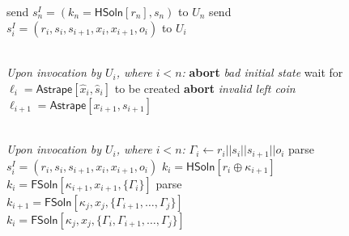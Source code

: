 \documentclass[USenglish,oneside,twocolumn]{article}
\begin{document}
\begin{figure}
\begin{framed}
\begin{minipage}{0.45\textwidth}
\begin{algorithmic}
                \State send $s^I_n=(k_n=\mathsf{HSoln}[r_n], s_n)$ to $U_n$
                \Else
                \State send $s^I_i=(r_i, s_i, s_{i+1}, x_i, x_{i+1}, o_i)$ to $U_i$
                \EndIf
                \EndFor
                \EndFunction
            \end{algorithmic}
            \medskip
            \begin{algorithmic}
                \\
                \emph{Upon invocation by $U_i$, where $i<n$:}
                \State \textbf{abort} \emph{bad initial state}
                \EndIf
                \State wait for $\ell_{i}=\mathsf{Astrape}[\hat{x}_i, \hat{s}_i]$ to be created
                \State \textbf{abort} \emph{invalid left coin}
                \EndIf
                \EndIf
                \Return $\ell_{i+1} = \mathsf{Astrape}[x_{i+1}, s_{i+1}]$
                \EndFunction
            \end{algorithmic}
        \end{minipage}
        \hfill
        \begin{minipage}{0.45\textwidth}
            \begin{algorithmic}
                \\
                \emph{Upon invocation by $U_i$, where $i<n$:}
                \State $\Gamma_i \gets r_i||s_i||s_{i+1}||o_i$
                \State parse $s_i^I = (r_i,s_i,s_{i+1},x_i,x_{i+1},o_i)$
                \State \Return $k_i = \mathsf{HSoln}[r_i \oplus \kappa_{i+1}]$
                \Else
                \State \Return $k_i = \mathsf{FSoln}[\kappa_{i+1}, x_{i+1}, \{ \Gamma_i \}]$
                \EndIf
                \Else
                \State parse $k_{i+1} = \mathsf{FSoln}[\kappa_j, x_j, \{ \Gamma_{i+1}, \dots, \Gamma_j \}]$
                \State \Return $k_i = \mathsf{FSoln}[\kappa_j, x_j, \{ \Gamma_i, \Gamma_{i+1}, \dots, \Gamma_j \}]$
                \EndIf
                \EndFunction
            \end{algorithmic}

\end{minipage}
\end{framed}
\end{figure}
\end{document}
